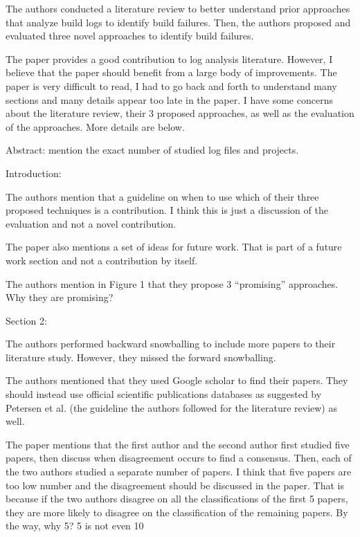 \documentclass[10pt,a4wide]{article}
\renewenvironment{leftbar}{%
	\vspace{0.1cm}
	\def\FrameCommand{\vrule width 0.4pt \hspace{15pt}}%
	\MakeFramed {\advance\hsize-\width \FrameRestore}}%
{\endMakeFramed\vspace{0.1cm}}
\begin{document}

\begin{leftbar}
The authors conducted a literature review to better understand prior approaches that analyze build logs to identify build failures. Then, the authors proposed and evaluated three novel approaches to identify build failures.

The paper provides a good contribution to log analysis literature. However, I believe that the paper should benefit from a large body of improvements. The paper is very difficult to read, I had to go back and forth to understand many sections and many details appear too late in the paper. I have some concerns about the literature review, their 3 proposed approaches, as well as the evaluation of the approaches. More details are below.

Abstract: mention the exact number of studied log files and projects.

Introduction:

The authors mention that a guideline on when to use which of their three proposed techniques is a contribution. I think this is just a discussion of the evaluation and not a novel contribution.

The paper also mentions a set of ideas for future work. That is part of a future work section and not a contribution by itself.

The authors mention in Figure 1 that they propose 3 “promising” approaches. Why they are promising?

Section 2:

The authors performed backward snowballing to include more papers to their literature study. However, they missed the forward snowballing.

The authors mentioned that they used Google scholar to find their papers. They should instead use official scientific publications databases as suggested by Petersen et al. (the guideline the authors followed for the literature review) as well.

The paper mentions that the first author and the second author first studied five papers, then discuss when disagreement occurs to find a consensus. Then, each of the two authors studied a separate number of papers. I think that five papers are too low number and the disagreement should be discussed in the paper. That is because if the two authors disagree on all the classifications of the first 5 papers, they are more likely to disagree on the classification of the remaining papers. By the way, why 5? 5 is not even 10%


\end{leftbar}
\end{document}

